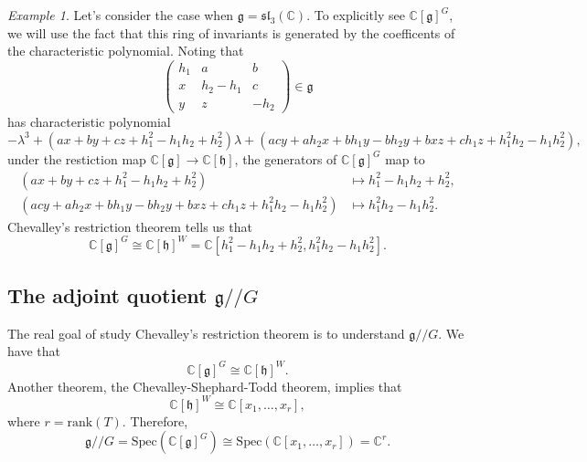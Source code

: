 \documentclass[12pt]{amsart}
\newcommand{\C}{\mathbb{C}}
\newcommand{\g}{\mathfrak{g}}
\newcommand{\h}{\mathfrak{h}}
\newcommand{\git}{/\!\!/}
\theoremstyle{remark}
\theoremstyle{remark}
\newtheorem*{example}{Example}
\theoremstyle{remark}
\begin{document}
\begin{example}
Let's consider the case when $\g = \mathfrak{sl}_3(\C)$.
To explicitly see $\C[\g]^G$, we will use the fact that this ring of invariants is generated by the coefficents of the characteristic polynomial.
Noting that
$$
\begin{pmatrix}
	h_1 & a & b \\
	x & h_2 - h_1 & c \\
	y & z & - h_2
\end{pmatrix} \in \g$$
has characteristic polynomial
$$- \lambda^3 + (ax + by + cz + h_1^2 - h_1 h_2 + h_2^2) \lambda 
+( acy + ah_2x + bh_1y - bh_2y + bxz + ch_1z + h_1^2h_2 - h_1h_2^2),$$
under the restiction map $\C[\g] \to \C[\h]$, the generators of $\C[\g]^G$ map to 
\begin{align*}
	(ax + by + cz + h_1^2 - h_1 h_2 + h_2^2) &\mapsto h_1^2 - h_1 h_2 + h_2^2, \\
	(acy + ah_2x + bh_1y - bh_2y + bxz + ch_1z + h_1^2h_2 - h_1h_2^2) &\mapsto h_1^2 h_2 - h_1 h_2^2.
\end{align*}
Chevalley's restriction theorem tells us that
$$\C[\g]^G \cong \C[\h]^W = \C[h_1^2 - h_1 h_2 + h_2^2, h_1^2 h_2 - h_1 h_2^2].$$
\end{example}

\subsection{The adjoint quotient $\g\git G$}
The real goal of study Chevalley's restriction theorem is to understand $\g \git G$.
We have that 
$$\C[\g]^G \cong \C[\h]^W.$$
Another theorem, the Chevalley-Shephard-Todd theorem, implies that
$$\C[\h]^W \cong \C[x_1, \ldots, x_r],$$
where $r = \mathrm{rank}(T)$.
Therefore, 
$$\g \git G = \mathrm{Spec}(\C[\g]^G) \cong \mathrm{Spec}(\C[x_1, \ldots, x_r]) = \C^r.$$
\end{document}
